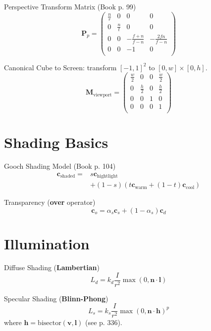 \documentclass[10pt,a4paper]{article}
\begin{document}
\begin{multicols}{3}
		Perspective Transform Matrix (Book p. 99)
		\begin{equation*}
			\mathbf{P}_p = \begin{pmatrix}
				\frac{n}{r} & 0 & 0 & 0 \\
				0 & \frac{n}{t} & 0 & 0 \\
				0 & 0 & -\frac{f+n}{f-n} & -\frac{2fn}{f-n} \\
				0 & 0 & -1 & 0 \\
			\end{pmatrix}
		\end{equation*}

		Canonical Cube to Screen: transform $[-1,1]^2$ to $[0,w]\times[0,h]$.
		\begin{equation*}
			\mathbf{M}_\text{viewport} = \begin{pmatrix}
				\frac{w}{2} & 0 & 0 & \frac{w}{2} \\
				0 & \frac{h}{2} & 0 & \frac{h}{2} \\
				0 & 0 & 1 & 0 \\
				0 & 0 & 0 & 1 \\
			\end{pmatrix}
		\end{equation*}

		\section{Shading Basics}
		Gooch Shading Model (Book p. 104)
		\begin{align*}
			\mathbf{c}_\text{shaded} =& s\mathbf{c}_\text{hightlight} \\ 
			&+ (1-s)(t\mathbf{c}_\text{warm}+(1-t)\mathbf{c}_\text{cool})
		\end{align*}

		Transparency (\textbf{over} operator)
		\begin{equation*}
			\mathbf{c}_o = \alpha_s\mathbf{c}_s + (1-\alpha_s)\mathbf{c}_d
		\end{equation*}

		\section{Illumination}

		Diffuse Shading (\textbf{Lambertian})
		\begin{equation*}
			L_d = k_d\frac{I}{r^2}\max(0,\mathbf{n}\cdot\mathbf{l})
		\end{equation*}

		Specular Shading (\textbf{Blinn-Phong})
		\begin{equation*}
			L_s = k_s\frac{I}{r^2}\max(0,\mathbf{n}\cdot\mathbf{h})^p
		\end{equation*}
		where $\mathbf{h} = \text{bisector}(\mathbf{v},\mathbf{l})$ (see p. 336).


\end{multicols}
\end{document}
